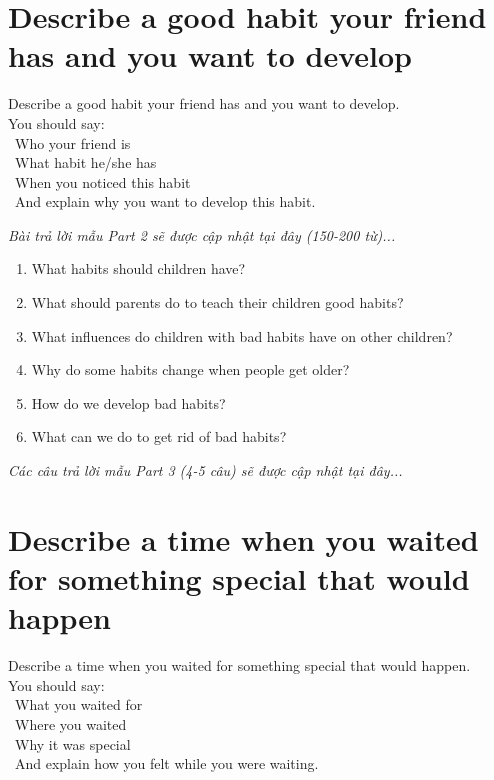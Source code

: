\section{Describe a good habit your friend has and you want to develop}
\begin{ieltsprompt}
Describe a good habit your friend has and you want to develop. \\
You should say: \\
\textbullet\ Who your friend is \\
\textbullet\ What habit he/she has \\
\textbullet\ When you noticed this habit \\
\textbullet\ And explain why you want to develop this habit. \\
\end{ieltsprompt}

\vspace{1em}
\textit{Bài trả lời mẫu Part 2 sẽ được cập nhật tại đây (150-200 từ)...}
\vspace{2em}

\begin{ieltsprompt}
\begin{enumerate}[itemsep=4pt]
    \item What habits should children have?
    \item What should parents do to teach their children good habits?
    \item What influences do children with bad habits have on other children?
    \item Why do some habits change when people get older?
    \item How do we develop bad habits?
    \item What can we do to get rid of bad habits?
\end{enumerate}
\end{ieltsprompt}

\vspace{1em}
\textit{Các câu trả lời mẫu Part 3 (4-5 câu) sẽ được cập nhật tại đây...}
\vspace{2em}

\section{Describe a time when you waited for something special that would happen}
\begin{ieltsprompt}
Describe a time when you waited for something special that would happen. \\
You should say: \\
\textbullet\ What you waited for \\
\textbullet\ Where you waited \\
\textbullet\ Why it was special \\
\textbullet\ And explain how you felt while you were waiting. \\
\end{ieltsprompt}

